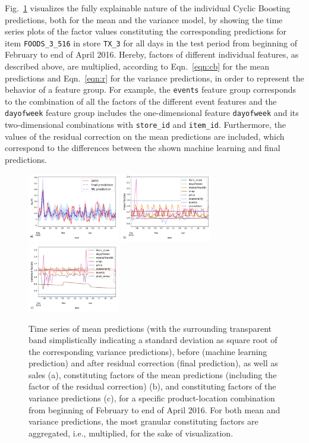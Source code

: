 \documentclass[BCOR=1mm, DIV=calc,10pt,
twoside=true,
twocolumn,
headings=normal]{scrartcl}
\newcommand{\fig}{Fig.~}
\newcommand{\eqn}{Eqn.~}
\begin{document}
\fig \ref{fig:factor_plots} visualizes the fully explainable nature of the individual Cyclic Boosting predictions, both for the mean and the variance model, by showing the time series plots of the factor values constituting the corresponding predictions for item \texttt{FOODS\_3\_516} in store \texttt{TX\_3} for all days in the test period from beginning of February to end of April 2016. Hereby, factors of different individual features, as described above, are multiplied, according to \eqn \eqref{eqn:cb} for the mean predictions and \eqn \eqref{eqn:r} for the variance predictions, in order to represent the behavior of a feature group. For example, the \texttt{events} feature group corresponds to the combination of all the factors of the different event features and the \texttt{dayofweek} feature group includes the one-dimensional feature \texttt{dayofweek} and its two-dimensional combinations with \texttt{store\_id} and \texttt{item\_id}. Furthermore, the values of the residual correction on the mean predictions are included, which correspond to the differences between the shown machine learning and final predictions.

\begin{figure}
\begin{center}
\includegraphics[width=4cm]{figs/ts_item_16_store_6}
\includegraphics[width=4cm]{figs/factors_ts}
\includegraphics[width=4cm]{figs/factors_ts_width}
\caption{\label{fig:factor_plots} Time series of mean predictions (with the surrounding transparent band simplistically indicating a standard deviation as square root of the corresponding variance predictions), before (machine learning prediction) and after residual correction (final prediction), as well as sales (a), constituting factors of the mean predictions (including the factor of the residual correction) (b), and constituting factors of the variance predictions (c), for a specific product-location combination from beginning of February to end of April 2016. For both mean and variance predictions, the most granular constituting factors are aggregated, i.e., multiplied, for the sake of visualization.}
\end{center}
\end{figure}
\end{document}
